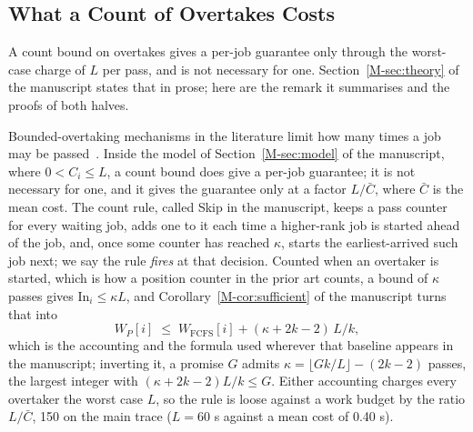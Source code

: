 \documentclass[mathematics,supfile,submit,moreauthors]{Definitions/mdpi}
\newcommand{\devnum}[1]{#1}
\begin{document}
\subsection{What a Count of Overtakes Costs}
\label{sec:supp_counts}

A count bound on overtakes gives a per-job guarantee only through the worst-case charge
of $L$ per pass, and is not necessary for one. Section~\ref*{M-sec:theory} of the manuscript states that
in prose; here are the remark it summarises and the proofs of both halves.

\begin{remark}
\label{rem:counts}
Bounded-overtaking mechanisms in the literature limit how many times a job may
be passed~\cite{grosof2021nudge,vanhoudt2022nudgek,grosof2022wcfs}. Inside the
model of Section~\ref*{M-sec:model} of the manuscript, where $0 < C_i \le L$, a count bound does
give a per-job guarantee; it is not necessary for one, and it gives the
guarantee only at a factor $L/\bar{C}$, where $\bar{C}$ is the mean cost. The count rule,
called Skip in the manuscript, keeps a pass counter for every waiting job, adds one to it
each time a higher-rank job is started ahead of the job, and, once some counter has reached
$\kappa$, starts the earliest-arrived such job next; we say the rule \emph{fires} at that
decision. Counted when an overtaker is started, which is how a position counter in the
prior art counts, a bound of $\kappa$ passes gives $\mathrm{In}_i \le \kappa L$, and
Corollary~\ref*{M-cor:sufficient} of the manuscript turns that into
\begin{equation}
  W_P[i] \;\le\; W_{\mathrm{FCFS}}[i] + (\kappa + 2k - 2)\,L/k ,
  \label{eq:skip}
\end{equation}
which is the accounting and the formula used wherever that baseline appears in
the manuscript; inverting it, a promise $G$ admits
$\kappa = \lfloor Gk/L \rfloor - (2k-2)$ passes, the largest integer with
$(\kappa + 2k-2)L/k \le G$. Either accounting charges every overtaker the worst
case $L$, so the rule is loose against a work budget by the ratio $L/\bar{C}$,
\devnum{150} on the main trace ($L = 60$ s against a mean cost of \devnum{0.40} s).
\end{remark}
\end{document}

